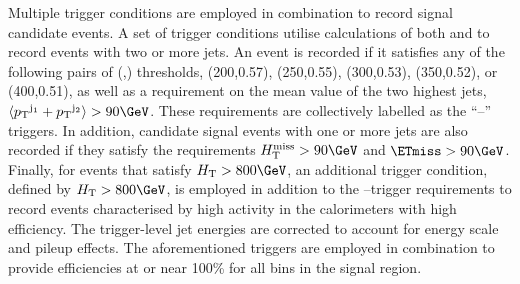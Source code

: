 Multiple trigger conditions are employed in combination to record
signal candidate events. A set of trigger conditions utilise
calculations of both \scalht and \alphat to record events with two or
more jets. An event is recorded if it satisfies any of the following
pairs of (\scalht,\alphat) thresholds, (200,0.57), (250,0.55),
(300,0.53), (350,0.52), or (400,0.51), as well as a requirement on the
mean value of the two highest \Pt jets, $\langle\Pt^{\mathrm{j_1}} +
\Pt^{\mathrm{j_2}}\rangle > 90\GeV$. These requirements are collectively
labelled as the ``\scalht--\alphat'' triggers. In addition, candidate
signal events with one or more jets are also recorded if they satisfy
the requirements $\HTmiss > 90\GeV$ and $\ETmiss > 90\GeV$. Finally,
for events that satisfy $\scalht > 800\GeV$, an additional trigger
condition, defined by $\scalht > 800\GeV$, is employed in addition to
the \scalht--\alphat trigger requirements to record events
characterised by high activity in the calorimeters with high
efficiency. The trigger-level jet energies are corrected to account
for energy scale and pileup effects. The aforementioned triggers are
employed in combination to provide efficiencies at or near 100\% for
all bins in the signal region.

